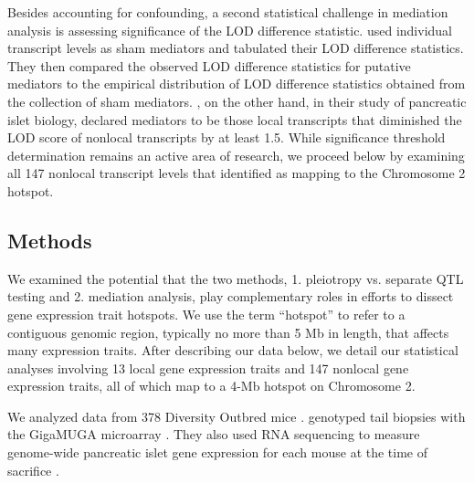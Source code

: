 \documentclass[oneside]{book}\usepackage[]{graphicx}\usepackage[]{color}
\begin{document}
\begin{titlepage}

Besides accounting for confounding, a second statistical challenge in mediation analysis is assessing significance of the LOD difference statistic.
\citet{chick2016defining} used individual transcript levels as sham mediators and tabulated their LOD difference statistics.
They then compared the observed LOD difference statistics for putative mediators to the empirical distribution of LOD difference statistics obtained from the collection of sham mediators.
\citet{keller2018genetic}, on the other hand, in their study of pancreatic islet
biology, declared mediators to be those local transcripts that diminished the LOD score
of nonlocal transcripts by at least 1.5.
While significance threshold determination remains an active area of research,
we proceed below by examining all 147 nonlocal transcript levels that
\citet{keller2018genetic} identified as mapping to the Chromosome 2 hotspot.



\subsection{Methods}

We examined the potential that the two methods, 1. pleiotropy vs. separate QTL testing and
2. mediation analysis, play complementary roles in efforts to dissect gene expression trait hotspots.
We use the term ``hotspot'' to refer to a contiguous genomic region,
typically no more than 5 Mb in length, that affects many expression traits.
After describing our data below, we detail our statistical analyses involving 13 local
gene expression traits and 147 nonlocal gene expression traits,
all of which map to a 4-Mb hotspot on Chromosome 2.


We analyzed data from 378 Diversity Outbred mice \citep{keller2018genetic}.
\citet{keller2018genetic} genotyped tail biopsies with the GigaMUGA microarray \citep{morgan2015mouse}.
They also used RNA sequencing to measure genome-wide pancreatic islet gene expression
for each mouse at the time of sacrifice \citep{keller2018genetic}.


\end{titlepage}
\end{document}

